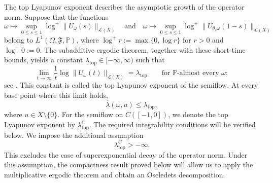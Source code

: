 \documentclass[reqno]{amsart}
\theoremstyle{plain}
\numberwithin{equation}{section}
\numberwithin{definition}{section}
\begin{document}
{The top Lyapunov exponent describes the asymptotic growth
of the operator norm. Suppose that the functions
\begin{equation*}
    \omega\mapsto
    \sup_{0\leq s\leq1}
    \log^+\|U_\omega(s)\|_{\mathcal L(X)}
    \quad\text{and}\quad
    \omega\mapsto
    \sup_{0\leq s\leq1}
    \log^+\|U_{\theta_s\omega}(1-s)\|_{\mathcal L(X)}
\end{equation*}
belong to $L^1(\Omega,\mathfrak F,\mathbb P)$, where
$\log^+r:=\max\{0,\log r\}$ for $r>0$ and $\log^+0:=0$.
The subadditive ergodic theorem, together with these
short-time bounds, yields a constant
$\lambda_{\mathrm{top}}\in[-\infty,\infty)$ such that
\begin{equation*}
    \lim_{t\to\infty}
    \frac{1}{t}\log\|U_\omega(t)\|_{\mathcal L(X)}
    =
    \lambda_{\mathrm{top}}
    \qquad\text{for }\mathbb P\text{-almost every }\omega;
\end{equation*}
see \cite[Section~3]{MierczynskiNovoObaya2020}.
This constant is called the top Lyapunov exponent of the
semiflow. At every base point where this limit holds,
\begin{equation*}
    \overline\lambda(\omega,u)\leq\lambda_{\mathrm{top}},
\end{equation*}
where $u\in X\setminus\{0\}$.  For the semiflow on $C([-1,0])$, we denote the top Lyapunov
exponent by $\lambda_{\mathrm{top}}^C$.
The required integrability conditions will be verified below.
We impose the additional assumption
\begin{equation*}
    \lambda_{\mathrm{top}}^C>-\infty.
\end{equation*}
This excludes the case of superexponential decay of the
operator norm. Under this assumption, the compactness result
proved below will allow us to apply the multiplicative
ergodic theorem and obtain an Oseledets decomposition.


}
\end{document}
